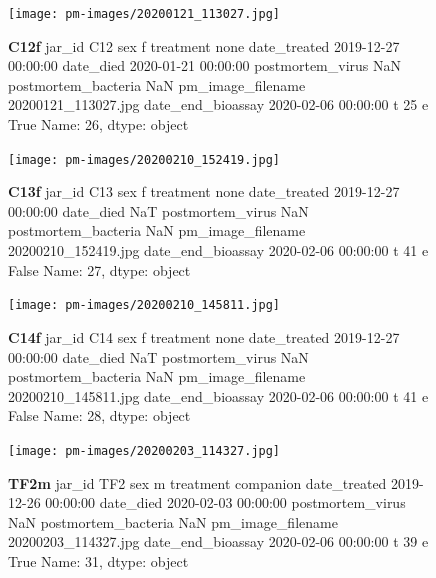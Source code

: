 \begin{figure}[h!]
\centering
\texttt{[image: pm-images/20200121\_113027.jpg]}
\caption{\textbf{C12f} jar\_id                                 C12
sex                                      f
treatment                             none
date\_treated           2019-12-27 00:00:00
date\_died              2020-01-21 00:00:00
postmortem\_virus                       NaN
postmortem\_bacteria                    NaN
pm\_image\_filename      20200121\_113027.jpg
date\_end\_bioassay      2020-02-06 00:00:00
t                                       25
e                                     True
Name: 26, dtype: object}
\end{figure}
\clearpage

\begin{figure}[h!]
\centering
\texttt{[image: pm-images/20200210\_152419.jpg]}
\caption{\textbf{C13f} jar\_id                                 C13
sex                                      f
treatment                             none
date\_treated           2019-12-27 00:00:00
date\_died                              NaT
postmortem\_virus                       NaN
postmortem\_bacteria                    NaN
pm\_image\_filename      20200210\_152419.jpg
date\_end\_bioassay      2020-02-06 00:00:00
t                                       41
e                                    False
Name: 27, dtype: object}
\end{figure}
\clearpage

\begin{figure}[h!]
\centering
\texttt{[image: pm-images/20200210\_145811.jpg]}
\caption{\textbf{C14f} jar\_id                                 C14
sex                                      f
treatment                             none
date\_treated           2019-12-27 00:00:00
date\_died                              NaT
postmortem\_virus                       NaN
postmortem\_bacteria                    NaN
pm\_image\_filename      20200210\_145811.jpg
date\_end\_bioassay      2020-02-06 00:00:00
t                                       41
e                                    False
Name: 28, dtype: object}
\end{figure}
\clearpage

\begin{figure}[h!]
\centering
\texttt{[image: pm-images/20200203\_114327.jpg]}
\caption{\textbf{TF2m} jar\_id                                 TF2
sex                                      m
treatment                        companion
date\_treated           2019-12-26 00:00:00
date\_died              2020-02-03 00:00:00
postmortem\_virus                       NaN
postmortem\_bacteria                    NaN
pm\_image\_filename      20200203\_114327.jpg
date\_end\_bioassay      2020-02-06 00:00:00
t                                       39
e                                     True
Name: 31, dtype: object}
\end{figure}
\clearpage

